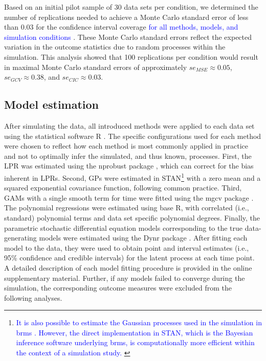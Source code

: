 \documentclass[man, floatsintext]{apa7}
\begin{document}
Based on an initial pilot sample of 30 data sets per condition, we determined
the number of replications needed to achieve a Monte Carlo standard error of
less than 0.03 for the confidence interval coverage \textcolor{blue}{for all
  methods, models, and simulation conditions}
\parencite{siepe_simulation_2023}. These Monte Carlo standard errors reflect
the expected variation in the outcome statistics due to random processes within
the simulation. This analysis showed that 100 replications per condition
would result in maximal Monte Carlo standard errors of approximately $se_{MSE}
  \approx 0.05$, $se_{GCV} \approx 0.38$, and $se_{CIC} \approx 0.03$.

\subsection{Model estimation}

After simulating the data, all introduced methods were applied to each data set
using the statistical software R \parencite{R-base}. The specific
configurations used for each method were chosen to reflect how each method is
most commonly applied in practice and not to optimally infer the simulated, and
thus known, processes. First, the LPR was estimated using the nprobust package
\parencite{R-nprobust}, which can correct for the bias inherent in LPRs.
Second, GPs were estimated in STAN\footnote{\textcolor{blue}{
    It is also possible to estimate the
    Gaussian processes used in the simulation in brms
    \parencite{burkner_brms_2017}.
    However,
    the direct implementation in STAN, which is the Bayesian inference software
    underlying brms, is computationally more efficient within the context of a
    simulation study.
  }}
\parencite{R-cmdstanr} with a zero mean and a squared exponential covariance
function, following common practice. Third, GAMs with a single smooth term for
time were fitted using the mgcv package \parencite{R-mgcv_a}. The polynomial
regressions were estimated using base R, with correlated (i.e., standard)
polynomial terms and data set specific polynomial degrees. Finally, the
parametric stochastic differential equation models corresponding to the true
data-generating models were estimated using the Dynr package
\parencite{R-dynr}. After fitting each model to the data, they were used to
obtain point and interval estimates (i.e., 95\% confidence and credible
intervals) for the latent process at each time point. A detailed description of
each model fitting procedure is provided in the online supplementary material.
Further, if any models failed to converge during the simulation, the
corresponding outcome measures were excluded from the following analyses.
\end{document}
